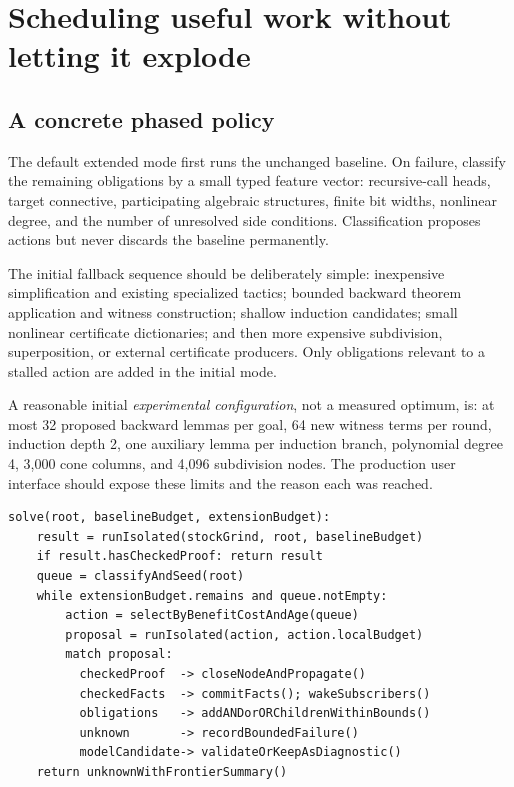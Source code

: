 \documentclass[11pt,a4paper]{article}
\begin{document}
\section{Scheduling useful work without letting it explode}
\subsection{A concrete phased policy}
The default extended mode first runs the unchanged baseline. On failure, classify the remaining obligations by a small typed feature vector: recursive-call heads, target connective, participating algebraic structures, finite bit widths, nonlinear degree, and the number of unresolved side conditions. Classification proposes actions but never discards the baseline permanently.

The initial fallback sequence should be deliberately simple: inexpensive simplification and existing specialized tactics; bounded backward theorem application and witness construction; shallow induction candidates; small nonlinear certificate dictionaries; and then more expensive subdivision, superposition, or external certificate producers. Only obligations relevant to a stalled action are added in the initial mode.

A reasonable initial \emph{experimental configuration}, not a measured optimum, is: at most 32 proposed backward lemmas per goal, 64 new witness terms per round, induction depth 2, one auxiliary lemma per induction branch, polynomial degree 4, 3,000 cone columns, and 4,096 subdivision nodes. The production user interface should expose these limits and the reason each was reached.

\begin{lstlisting}[caption={Scheduler pseudocode; not an existing Lean API.}]
solve(root, baselineBudget, extensionBudget):
    result = runIsolated(stockGrind, root, baselineBudget)
    if result.hasCheckedProof: return result
    queue = classifyAndSeed(root)
    while extensionBudget.remains and queue.notEmpty:
        action = selectByBenefitCostAndAge(queue)
        proposal = runIsolated(action, action.localBudget)
        match proposal:
          checkedProof  -> closeNodeAndPropagate()
          checkedFacts  -> commitFacts(); wakeSubscribers()
          obligations   -> addANDorORChildrenWithinBounds()
          unknown       -> recordBoundedFailure()
          modelCandidate-> validateOrKeepAsDiagnostic()
    return unknownWithFrontierSummary()
\end{lstlisting}
\end{document}
